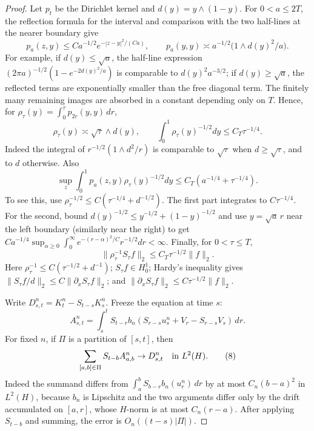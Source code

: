 \documentclass[12pt]{article}
\newcommand{\1}{\mathbf 1}
\begin{document}
\begin{proof}
Let \(p_t\) be the Dirichlet kernel and \(d(y)=y\wedge(1-y)\).  For
\(0<a\le 2T\), the reflection formula for the interval and comparison with
the two half-lines at the nearer boundary give
\[
p_a(z,y)\le Ca^{-1/2}e^{-|z-y|^2/(Ca)},\qquad
p_a(y,y)\asymp a^{-1/2}\bigl(1\wedge d(y)^2/a\bigr).          \tag{3}
\]
For example, if \(d(y)\le\sqrt a\), the half-line expression
\((2\pi a)^{-1/2}(1-e^{-2d(y)^2/a})\) is comparable to \(d(y)^2a^{-3/2}\);
if \(d(y)\ge\sqrt a\), the reflected terms are exponentially smaller than
the free diagonal term.  The finitely many remaining images are absorbed in a
constant depending only on \(T\).  Hence, for
\(\rho_\tau(y)=\int_0^\tau p_{2r}(y,y)\,dr\),
\[
        \rho_\tau(y)\asymp \sqrt{\tau}\wedge d(y),\qquad
        \int_0^1\rho_\tau(y)^{-1/2}dy\le C_T\tau^{-1/4}.      \tag{4}
\]
Indeed the integral of \(r^{-1/2}(1\wedge d^2/r)\) is comparable to
\(\sqrt\tau\) when \(d\ge\sqrt\tau\), and to \(d\) otherwise.  Also
\[
 \sup_z\int_0^1p_a(z,y)\rho_\tau(y)^{-1/2}dy
 \le C_T(a^{-1/4}+\tau^{-1/4}).                              \tag{5}
\]
To see this, use \(\rho_\tau^{-1/2}\le C(\tau^{-1/4}+d^{-1/2})\).  The first
part integrates to \(C\tau^{-1/4}\).  For the second, bound
\(d(y)^{-1/2}\le y^{-1/2}+(1-y)^{-1/2}\) and use
\(y=\sqrt a\,r\) near the left boundary (similarly near the right) to get
\(Ca^{-1/4}\sup_{\alpha\ge0}\int_0^\infty
e^{-(r-\alpha)^2/C}r^{-1/2}dr<\infty\).  Finally, for \(0<\tau\le T\),
\[
        \|\rho_\tau^{-1}S_\tau f\|_2\le C_T\tau^{-1/2}\|f\|_2. \tag{6}
\]
Here \(\rho_\tau^{-1}\le C(\tau^{-1/2}+d^{-1})\); \(S_\tau f\in H^1_0\);
Hardy's inequality gives \(\|S_\tau f/d\|_2\le C\|\partial_xS_\tau f\|_2\);
and \(\|\partial_xS_\tau f\|_2\le C\tau^{-1/2}\|f\|_2\).

Write \(D^n_{s,t}=K_t^n-S_{t-s}K_s^n\).  Freeze the equation at time \(s\):
\[
 A^n_{s,t}=\int_s^tS_{t-r}
 b_n\!\left(S_{r-s}u_s^n+V_r-S_{r-s}V_s\right)\,dr .          \tag{7}
\]
For fixed \(n\), if \(\Pi\) is a partition of \([s,t]\), then
\[
 \sum_{[a,b]\in\Pi}S_{t-b}A^n_{a,b}\to D^n_{s,t}\quad\hbox{in }L^2(H).
 \tag{8}
\]
Indeed the summand differs from
\(\int_a^bS_{b-r}b_n(u_r^n)\,dr\) by at most
\(C_n(b-a)^2\) in \(L^2(H)\), because \(b_n\) is Lipschitz and the two
arguments differ only by the drift accumulated on \([a,r]\), whose \(H\)-norm
is at most \(C_n(r-a)\).  After applying \(S_{t-b}\) and summing, the error is
\(O_n((t-s)|\Pi|)\).


\end{proof}
\end{document}
